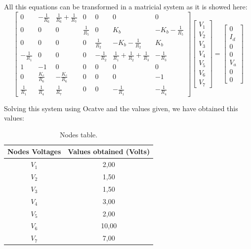 \noindent All this equations can be transformed in a matricial system as it is showed here:
$$ \left[ \begin{array}{ccccccc} 0 & -\frac{1}{R_6} & \frac{1}{R_6} + \frac{1}{R_7} & 0 & 0 & 0 & 0 \\
0 & 0 & 0 & \frac{1}{R_5} & 0 & K_b & -K_b - \frac{1}{R_5} \\
0 & 0 & 0 & 0 & \frac{1}{R_2} & -K_b - \frac{1}{R_2} & K_b
\\ -\frac{1}{R_1} & 0 & 0 & 0 & -\frac{1}{R_2} & \frac{1}{R_1} + \frac{1}{R_2} + \frac{1}{R_3} & -\frac{1}{R_3}
\\ 1 & -1 & 0 & 0 & 0 & 0 & 0
\\ 0 & \frac{K_c}{R_6} & -\frac{K_c}{R_6} & 0 & 0 & 0 & -1
\\ \frac{1}{R_1} & \frac{1}{R_4} & \frac{1}{R_7} & 0 & 0 & -\frac{1}{R_1} & -\frac{1}{R_4}\end{array} \right]
\left[ \begin{array}{c} V_1 \\ V_2 \\ V_3 \\ V_4 \\ V_5 \\ V_6 \\ V_7\end{array} \right] = 
\left[ \begin{array}{c} 0 \\ I_d \\ 0 \\ 0 \\ V_a \\ 0 \\ 0\end{array} \right] $$

\noindent Solving this system using Ocatve and the values given, we have obtained this values:
\begin{table}[h!]
\centering
\begin{small}
\caption{Nodes table.} \label{Table3}
\begin{tabular}{c|c}
\hline
Nodes Voltages & Values obtained (Volts)\\
\hline
$V_1$           & 2,00 \\
$V_2$  & 1,50 \\
$V_3$         & 1,50 \\
$V_4$   & 3,00 \\
$V_5$              & 2,00 \\
$V_6$                  & 10,00 \\
$V_7$     &  7,00 \\
\hline
\end{tabular}
\end{small}
\end{table}

